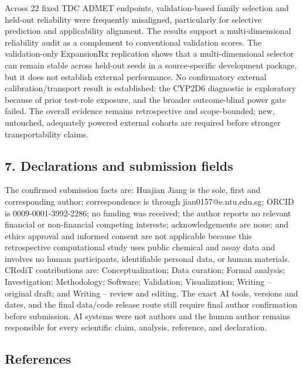 \documentclass[
]{article}
\begin{document}
Across 22 fixed TDC ADMET endpoints, validation-based family selection
and held-out reliability were frequently misaligned, particularly for
selective prediction and applicability alignment. The results support a
multi-dimensional reliability audit as a complement to conventional
validation scores. The validation-only ExpansionRx replication shows that a
multi-dimensional selector can remain stable across held-out seeds in a
source-specific development package, but it does not establish external
performance. No confirmatory external calibration/transport result
is established: the CYP2D6 diagnostic is exploratory because of prior
test-role exposure, and the broader outcome-blind power gate failed. The
overall evidence remains retrospective and scope-bounded; new, untouched,
adequately powered external cohorts are required before stronger
transportability claims.

\subsection{7. Declarations and submission
fields}\label{declarations-and-submission-fields}

The confirmed submission facts are: Huajian Jiang is the sole, first and
corresponding author; correspondence is through jian0157@e.ntu.edu.sg;
ORCID is 0009-0001-3992-2286; no funding was received; the author reports
no relevant financial or non-financial competing interests; acknowledgements
are none; and ethics approval and informed consent are not applicable because
this retrospective computational study uses public chemical and assay data
and involves no human participants, identifiable personal data, or human
materials. CRediT contributions are: Conceptualization; Data curation;
Formal analysis; Investigation; Methodology; Software; Validation;
Visualization; Writing -- original draft; and Writing -- review and editing.
The exact AI tools, versions and dates, and the final data/code release route
still require final author confirmation before submission. AI systems were not
authors and the human author remains responsible for every scientific claim,
analysis, reference, and declaration.

\subsection{References}\label{references}
\end{document}
